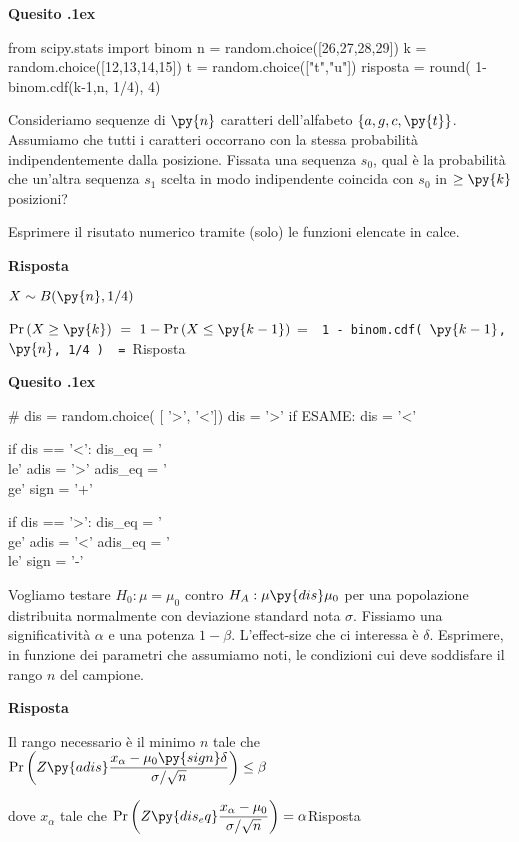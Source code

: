\documentclass[11pt,twoside,a4paper]{article}
\newcounter{quesito}
\newenvironment{question}{\addtocounter{quesito}{1}\par\textbf{Quesito \thequesito.\kern1ex}}{\vspace{0.5\parskip}}
\newenvironment{answer}{\par\textbf{Risposta\quad}}{\vspace{\parskip}}
\begin{document}
  
\begin{question}
\begin{pycode}
from scipy.stats import binom
n = random.choice([26,27,28,29])
k = random.choice([12,13,14,15])
t = random.choice(["t","u"])
risposta = round( 1- binom.cdf(k-1,n, 1/4), 4)
\end{pycode}
Consideriamo sequenze di $\py{n}$ caratteri dell'alfabeto $\{a,g,c,\py{t}\}$. 
Assumiamo che tutti i caratteri occorrano con la stessa probabilità indipendentemente dalla posizione.
Fissata una sequenza $s_0$, qual è la probabilità che un'altra sequenza $s_1$ 
scelta in modo indipendente coincida con $s_0$ in $\ge\py{k}$ posizioni?   

Esprimere il risutato numerico tramite (solo) le funzioni elencate in calce.
\begin{answer}
    
  $X\sim B(\py{n}, 1/4)$
  
  $\Pr(X\ge \py{k})\ =\ 1-\Pr(X\le \py{k-1})$
  \quad =\ 
  {\tt{\color{blue}  1 -  binom.cdf( $\py{k-1}$, $\py{n}$, 1/4 )}
  \ =\ 
  \py{risposta}}{\color{blue}\hfill Risposta}
\end{answer}
  \end{question}



\begin{question} %
\begin{pycode}
# dis = random.choice( [ '>', '<'])
dis =  '>'
if ESAME: dis = '<'

if dis == '<':
   dis_eq  = '\\le'
   adis    = '>'
   adis_eq = '\\ge'
   sign = '+'

if dis == '>':
   dis_eq  = '\\ge'
   adis    = '<'
   adis_eq = '\\le'
   sign = '-'

\end{pycode}
Vogliamo testare $H_0:\mu=\mu_0$ contro $H_A:\mu\py{dis}\mu_0$ per una popolazione distribuita normalmente con deviazione standard nota $\sigma$. Fissiamo una significatività $\alpha$ e una potenza $1-\beta$. L'effect-size che ci interessa è $\delta$.  Esprimere, in funzione dei parametri che assumiamo noti, le condizioni cui deve soddisfare il rango $n$ del campione.

\begin{answer}

{\color{blue}Il rango necessario è il minimo $n$ tale che $\displaystyle\Pr\bigg(Z\py{adis}\frac{x_\alpha-\mu_0\py{sign}\delta}{\sigma/\sqrt{n}}\bigg)\le\beta$

dove $x_\alpha$ tale che $\displaystyle\Pr\bigg(Z\py{dis_eq} \frac{x_\alpha-\mu_0}{\sigma/\sqrt{n}}\bigg)=\alpha$\hfill Risposta}


\end{answer}
\end{question}
\end{document}
